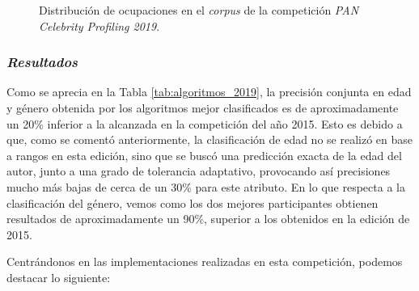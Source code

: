 \begin{figure}[H]
	\centering
	\caption{Distribución de ocupaciones en el \textit{corpus} de la competición \textit{PAN Celebrity Profiling 2019}.}
	\label{fig:distribucion_ocupacion_2019}
\end{figure}

\subsubsection{\textit{Resultados}}

Como se aprecia en la Tabla \ref{tab:algoritmos_2019}, la precisión conjunta en edad y género obtenida por los algoritmos mejor
clasificados es de aproximadamente un 20\% inferior a la alcanzada en la competición del año 2015. Esto es debido a que,
como se comentó anteriormente, la clasificación de edad no se realizó en base a rangos en esta edición, sino que se
buscó una predicción exacta de la edad del autor, junto a una grado de tolerancia adaptativo, provocando así precisiones mucho
más bajas de cerca de un 30\% para este atributo. En lo que respecta a la clasificación del género, vemos como los dos 
mejores participantes obtienen resultados de aproximadamente un 90\%, superior a los obtenidos en la edición de 2015. 

\bigskip
Centrándonos en las implementaciones realizadas en esta competición, podemos destacar lo siguiente:

